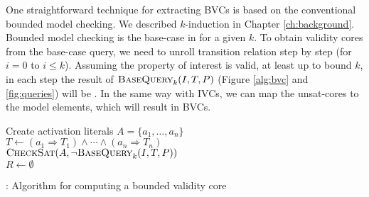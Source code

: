 One straightforward technique for extracting BVCs is based on the conventional bounded model checking.
We described $k$-induction in Chapter \ref{ch:background}. Bounded model checking is the base-case in \label{fig:k-induction} for a given $k$. To obtain validity cores from the base-case query, we need to unroll transition relation step by step (for $i=0$ to $i \leq k$). Assuming the property of interest is valid, at least up to bound $k$, in each step the result of $\textsc{BaseQuery}_k(I, T, P)$ (Figure \ref{alg:bvc} and \ref{fig:queries}) will be \unsat . In the same way with IVCs, we can map the unsat-cores to the model elements, which will result in BVCs.

\begin{algorithm}[t]
  \BlankLine
   Create activation literals $A = \{a_1, \ldots, a_n\}$ \\
  $T \leftarrow (a_1 \Rightarrow T_1) \land \cdots \land (a_n \Rightarrow T_n)$ \\
  $\textsc{CheckSat}(A, \neg\textsc{BaseQuery}_k(I, T, P))$ \\
  $R \leftarrow \emptyset$ \\
\caption{\bvcalg: Algorithm for computing a bounded validity core}
\label{alg:bvc}
\end{algorithm} 

